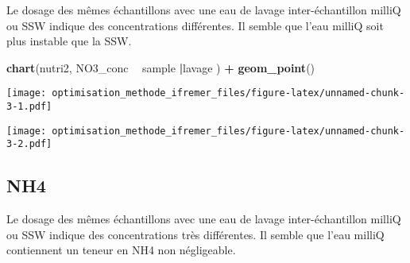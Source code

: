 \documentclass[]{article}
\newenvironment{Shaded}{\begin{snugshade}}{\end{snugshade}}
\newcommand{\KeywordTok}[1]{\textcolor[rgb]{0.13,0.29,0.53}{\textbf{#1}}}
\newcommand{\DataTypeTok}[1]{\textcolor[rgb]{0.13,0.29,0.53}{#1}}
\newcommand{\FloatTok}[1]{\textcolor[rgb]{0.00,0.00,0.81}{#1}}
\newcommand{\CharTok}[1]{\textcolor[rgb]{0.31,0.60,0.02}{#1}}
\newcommand{\StringTok}[1]{\textcolor[rgb]{0.31,0.60,0.02}{#1}}
\newcommand{\OperatorTok}[1]{\textcolor[rgb]{0.81,0.36,0.00}{\textbf{#1}}}
\newcommand{\NormalTok}[1]{#1}
\begin{document}
Le dosage des mêmes échantillons avec une eau de lavage
inter-échantillon milliQ ou SSW indique des concentrations différentes.
Il semble que l'eau milliQ soit plus instable que la SSW.

\begin{Shaded}
\begin{Highlighting}[]
\KeywordTok{chart}\NormalTok{(nutri2, NO3_conc }\OperatorTok{~}\StringTok{ }\NormalTok{sample }\OperatorTok{|}\NormalTok{lavage ) }\OperatorTok{+}
\StringTok{  }\KeywordTok{geom_point}\NormalTok{()}
\end{Highlighting}
\end{Shaded}

\texttt{[image: optimisation\_methode\_ifremer\_files/figure-latex/unnamed-chunk-3-1.pdf]}

\begin{Shaded}
\end{Shaded}

\texttt{[image: optimisation\_methode\_ifremer\_files/figure-latex/unnamed-chunk-3-2.pdf]}

\subsection{NH4}\label{nh4}

Le dosage des mêmes échantillons avec une eau de lavage
inter-échantillon milliQ ou SSW indique des concentrations très
différentes. Il semble que l'eau milliQ contiennent un teneur en NH4 non
négligeable.

\begin{Shaded}
\end{Shaded}
\end{document}
